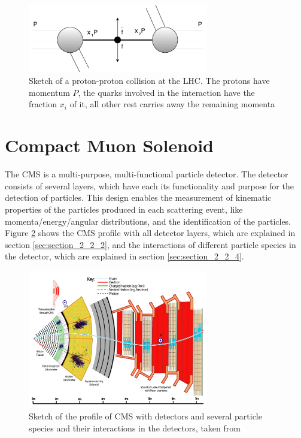 \begin{figure}[ht]
	\centering
	\includegraphics[width=0.7\textwidth]{pictures/ppcollision.pdf}

	\caption[Sketch of proton-proton collision]{Sketch of a proton-proton collision at the \gls{LHC}. The protons have momentum $P$, the quarks involved in the interaction have the fraction $x_{i}$ of it, all other rest carries away the remaining momenta}
	\label{fig:fig_2_4}
\end{figure}


\section{Compact Muon Solenoid}
\label{sec:section_2_2}

The \gls{CMS} is a multi-purpose, multi-functional particle detector. The detector consists of several layers, which have each its functionality and purpose for the detection of particles. This design enables the measurement of kinematic properties of the particles produced in each scattering event, like momenta/energy/angular distributions, and the identification of the particles. Figure \ref{fig:fig_2_5} shows the \gls{CMS} profile with all detector layers, which are explained in section \ref{sec:section_2_2_2}, and the interactions of different particle species in the detector, which are explained in section \ref{sec:section_2_2_4}.

\begin{figure}[ht]
	\centering
	\includegraphics[width=0.7\textwidth]{pictures/CMS.pdf}

	\caption[Profile of CMS detector]{Sketch of the profile of \gls{CMS} with detectors and several particle species and their interactions in the detectors, taken from \cite{PARTICLEFLOW}}
	\label{fig:fig_2_5}
\end{figure}


